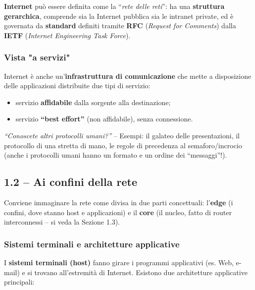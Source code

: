 \documentclass[12pt, a4paper]{article}
\begin{document}
\textbf{Internet} può essere definita come la ``\textit{rete delle reti}'': ha una \textbf{struttura gerarchica}, comprende sia la Internet pubblica sia le intranet private, ed è governata da \textbf{standard} definiti tramite \textbf{RFC} (\textit{Request for Comments}) dalla \textbf{IETF} (\textit{Internet Engineering Task Force}).

\subsubsection{Vista "a servizi"}

Internet è anche un'\textbf{infrastruttura di comunicazione} che mette a disposizione delle applicazioni distribuite due tipi di servizio:

\begin{itemize}
    \item servizio \textbf{affidabile} dalla sorgente alla destinazione;
    \item servizio \textbf{``best effort''} (non affidabile), senza connessione.
\end{itemize}

\begin{tcolorbox}[colback=cyan!5, colframe=blue!40!black, title=\textbf{Possibile domanda orale}]
\textit{``Conoscete altri protocolli umani?''} -- Esempi: il galateo delle presentazioni, il protocollo di una stretta di mano, le regole di precedenza al semaforo/incrocio (anche i protocolli umani hanno un formato e un ordine dei ``messaggi''!).
\end{tcolorbox}

\subsection{1.2 -- Ai confini della rete}

Conviene immaginare la rete come divisa in due parti concettuali: l'\textbf{edge} (i confini, dove stanno host e applicazioni) e il \textbf{core} (il nucleo, fatto di router interconnessi -- si veda la Sezione 1.3).

\subsubsection{Sistemi terminali e architetture applicative}

I \textbf{sistemi terminali (host)} fanno girare i programmi applicativi (es. Web, e-mail) e si trovano all'estremità di Internet. Esistono due architetture applicative principali:
\end{document}
